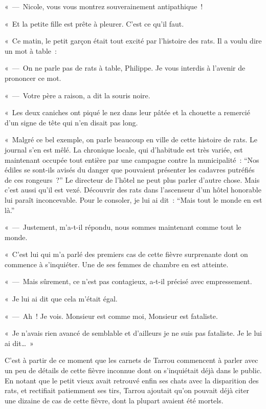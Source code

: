 \documentclass[french,twoside]{book} %
\begin{document}
« — Nicole, vous vous montrez souverainement antipathique !\par
« Et la petite fille est prête à pleurer. C’est ce qu’il faut.\par
« Ce matin, le petit garçon était tout excité par l’histoire des rats. Il a voulu dire un mot à table :\par
« — On ne parle pas de rats à table, Philippe. Je vous interdis à l’avenir de prononcer ce mot.\par
« — Votre père a raison, a dit la souris noire.\par
« Les deux caniches ont piqué le nez dans leur pâtée et la chouette a remercié d’un signe de tête qui n’en disait pas long.\par
« Malgré ce bel exemple, on parle beaucoup en ville de cette histoire de rats. Le journal s’en est mêlé. La chronique locale, qui d’habitude est très variée, est maintenant occupée tout entière par une campagne contre la municipalité : “Nos édiles se sont-ils avisés du danger que pouvaient présenter les cadavres putréfiés de ces rongeurs ?” Le directeur de l’hôtel ne peut plus parler d’autre chose. Mais c’est aussi qu’il est vexé. Découvrir des rats dans l’ascenseur d’un hôtel honorable lui paraît inconcevable. Pour le consoler, je lui ai dit : “Mais tout le monde en est là.”\par
« — Justement, m’a-t-il répondu, nous sommes maintenant comme tout le monde.\par
« C’est lui qui m’a parlé des premiers cas de cette fièvre surprenante dont on commence à s’inquiéter. Une de ses femmes de chambre en est atteinte.\par
« — Mais sûrement, ce n’est pas contagieux, a-t-il précisé avec empressement.\par
« Je lui ai dit que cela m’était égal.\par
« — Ah ! Je vois. Monsieur est comme moi, Monsieur est fataliste.\par
« Je n’avais rien avancé de semblable et d’ailleurs je ne suis pas fataliste. Je le lui ai dit… »\par
C’est à partir de ce moment que les carnets de Tarrou commencent à parler avec un peu de détails de cette fièvre inconnue dont on s’inquiétait déjà dans le public. En notant que le petit vieux avait retrouvé enfin ses chats avec la disparition des rats, et rectifiait patiemment ses tirs, Tarrou ajoutait qu’on pouvait déjà citer une dizaine de cas de cette fièvre, dont la plupart avaient été mortels.\par
\end{document}

